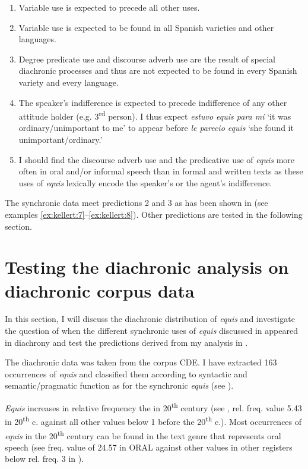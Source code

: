 \documentclass[output=paper]{langsci/langscibook}
\begin{document}
\begin{enumerate}
	\item Variable use is expected to precede all other uses.
	\item Variable use is expected to be found in all Spanish varieties and other languages.
	\item Degree predicate use and discourse adverb use are the result of special diachronic processes and thus are not expected to be found in every Spanish variety and every language.
	\item The speaker’s indifference is expected to precede indifference of any other attitude holder (e.g. 3\textsuperscript{rd} person). I thus expect \textit{estuvo equis para mí} ‘it was ordinary/unimportant to me’ to appear before \textit{le parecio equis} ‘she found it unimportant/ordinary.’
	\item I should find the discourse adverb use and the predicative use of \textit{equis} more often in oral and/or informal speech than in formal and written texts as these uses of \textit{equis} lexically encode the speaker’s or the agent’s indifference.
\end{enumerate}

The synchronic data meet predictions 2 and 3 as has been shown in  (see examples \ref{ex:kellert:7}--\ref{ex:kellert:8}). Other predictions are tested in the following section.

\section{Testing the diachronic analysis on diachronic corpus data}\label{sec:kellert:5}
In this section, I will discuss the diachronic distribution of \textit{equis} and investigate the question of when the different synchronic uses of \textit{equis} discussed in  appeared in diachrony and test the predictions derived from my analysis in .

The diachronic data was taken from the corpus CDE. I have extracted 163 occurrences of \textit{equis} and classified them according to syntactic and semantic/pragmatic function as for the synchronic \textit{equis} (see ).

\textit{Equis} increases in relative frequency the in 20\textsuperscript{th} century (see , rel. freq. value 5.43 in 20\textsuperscript{th} c. against all other values below 1 before the 20\textsuperscript{th} c.). Most occurrences of \textit{equis} in the 20\textsuperscript{th} century can be found in the text genre that represents oral speech (see freq. value of 24.57 in ORAL against other values in other registers below rel. freq. 3 in ).
\end{document}
